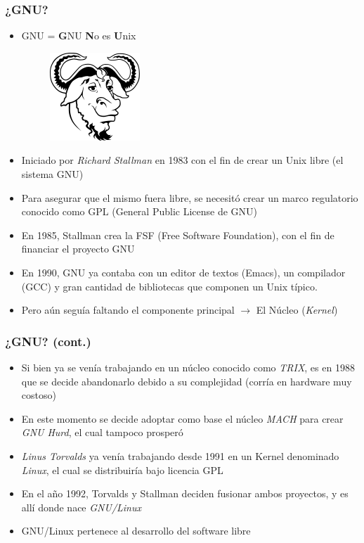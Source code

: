 \begin{frame}
	\frametitle{¿GNU?}
	\begin{itemize}
		\item GNU = \textbf{G}NU \textbf{N}o es \textbf{U}nix
		\begin{figure}
			\centering
			\includegraphics[scale=0.2]{images/gnu.png}
		\end{figure}
		\item Iniciado por \emph{Richard Stallman} en 1983 con el fin de crear un Unix libre (el sistema GNU)
		\item Para asegurar que el mismo fuera libre, se necesitó crear un marco regulatorio conocido como GPL (General Public License de GNU)
		\item En 1985, Stallman crea la FSF (Free Software Foundation), con el fin de financiar el proyecto GNU
		\item En 1990, GNU ya contaba con un editor de textos (Emacs), un compilador (GCC) y gran cantidad de bibliotecas que componen un Unix típico.
		\item Pero aún seguía faltando el componente principal $\rightarrow$ El Núcleo (\textit{Kernel})
	\end{itemize}
\end{frame}

\begin{frame}
	\frametitle{¿GNU? (cont.)}
	\begin{itemize}
		\item Si bien ya se venía trabajando en un núcleo conocido como \textit{TRIX}, es en 1988 que se decide abandonarlo debido a su complejidad (corría en hardware muy costoso)
		\item En este momento se decide adoptar como base el núcleo \textit{MACH} para crear \textit{GNU Hurd}, el cual tampoco prosperó
		\item \emph{Linus Torvalds} ya venía trabajando desde 1991 en un Kernel denominado \textit{Linux}, el cual se distribuiría bajo licencia GPL
		\item En el año 1992, Torvalds y Stallman deciden fusionar ambos proyectos, y es allí donde nace \textit{GNU/Linux}
		\item GNU/Linux pertenece al desarrollo del software libre	
	\end{itemize}
\end{frame}

